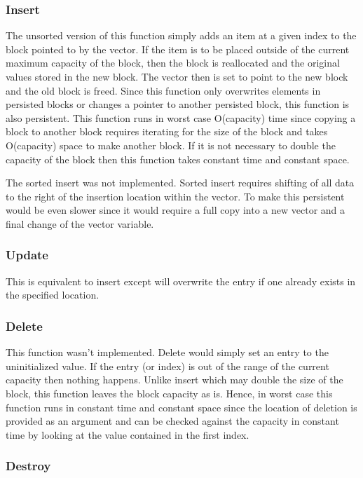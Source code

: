 \documentclass[twocolumn]{article}
\begin{document}
\subsubsection{Insert}

The unsorted version of this function simply adds an item at a given index to
the block pointed to by the vector. If the item is to be placed outside of the
current maximum capacity of the block, then the block is reallocated and the
original values stored in the new block. The vector then is set to point to the
new block and the old block is freed. Since this function only overwrites
elements in persisted blocks or changes a pointer to another persisted block,
this function is also persistent. This function runs in worst case O(capacity)
time since copying a block to another block requires iterating for the size of
the block and takes O(capacity) space to make another block. If it is not
necessary to double the capacity of the block then this function takes constant
time and constant space.

The sorted insert was not implemented. Sorted insert requires shifting of all
data to the right of the insertion location within the vector. To make this
persistent would be even slower since it would require a full copy into a new
vector and a final change of the vector variable.

\subsubsection{Update}

This is equivalent to insert except will overwrite the entry if one already
exists in the specified location.

\subsubsection{Delete}

This function wasn't implemented. Delete would simply set an entry to the
uninitialized value. If the entry (or index) is out of the range of the current
capacity then nothing happens. Unlike insert which may double the size of the
block, this function leaves the block capacity as is. Hence, in worst case this
function runs in constant time and constant space since the location of deletion
is provided as an argument and can be checked against the capacity in constant
time by looking at the value contained in the first index.

\subsubsection{Destroy}
\end{document}
